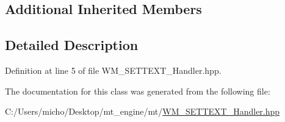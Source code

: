 \subsection*{Additional Inherited Members}


\subsection{Detailed Description}


Definition at line 5 of file W\+M\+\_\+\+S\+E\+T\+T\+E\+X\+T\+\_\+\+Handler.\+hpp.



The documentation for this class was generated from the following file\+:\begin{DoxyCompactItemize}
\item 
C\+:/\+Users/micho/\+Desktop/mt\+\_\+engine/mt/\hyperlink{_w_m___s_e_t_t_e_x_t___handler_8hpp}{W\+M\+\_\+\+S\+E\+T\+T\+E\+X\+T\+\_\+\+Handler.\+hpp}\end{DoxyCompactItemize}
